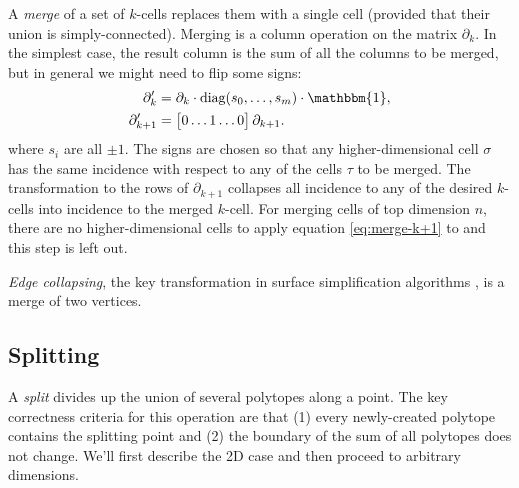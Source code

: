 \documentclass[twocolumn]{article}
\begin{document}
A \emph{merge} of a set of $k$-cells replaces them with a single cell (provided that their union is simply-connected).
Merging is a column operation on the matrix $\partial_k$.
In the simplest case, the result column is the sum of all the columns to be merged, but in general we might need to flip some signs:
\begin{align}
    \partial_k' & = \partial_k\cdot\text{diag}(s_0, \ldots, s_m)\cdot\mathbbm{1}, \\
    \partial_{k + 1}' & = \left[\begin{matrix} 0 \ldots 1 \ldots 0\end{matrix}\right]\partial_{k + 1}. \label{eq:merge-k+1}
\end{align}
where $s_i$ are all $\pm 1$.
The signs are chosen so that any higher-dimensional cell $\sigma$ has the same incidence with respect to any of the cells $\tau$ to be merged.
The transformation to the rows of $\partial_{k + 1}$ collapses all incidence to any of the desired $k$-cells into incidence to the merged $k$-cell.
For merging cells of top dimension $n$, there are no higher-dimensional cells to apply equation \eqref{eq:merge-k+1} to and this step is left out.

\emph{Edge collapsing}, the key transformation in surface simplification algorithms \cite{gueziec1995surface}, is a merge of two vertices.


\subsection{Splitting}

A \emph{split} divides up the union of several polytopes along a point.
The key correctness criteria for this operation are that (1) every newly-created polytope contains the splitting point and (2) the boundary of the sum of all polytopes does not change.
We'll first describe the 2D case and then proceed to arbitrary dimensions.
\end{document}
